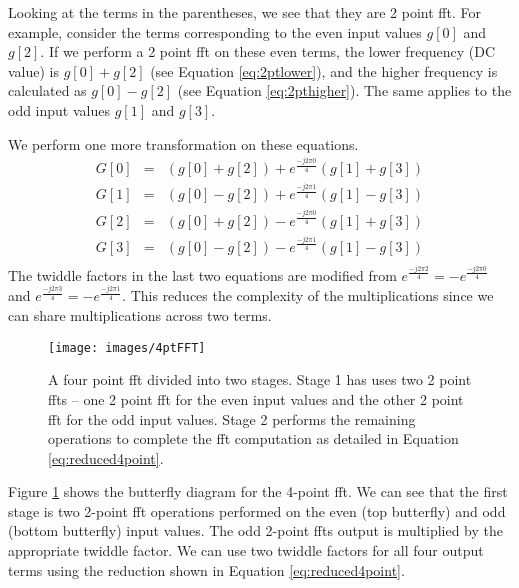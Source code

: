 Looking at the terms in the parentheses, we see that they are 2 point \gls{fft}. For example, consider the terms corresponding to the even input values $g[0]$ and $g[2]$. If we perform a 2 point \gls{fft} on these even terms, the lower frequency (DC value) is $g[0] + g[2]$ (see Equation \ref{eq:2ptlower}), and the higher frequency is calculated as $g[0] - g[2]$ (see Equation \ref{eq:2pthigher}). The same applies to the odd input values $g[1]$ and $g[3]$. 

We perform one more transformation on these equations.
\begin{equation}
\begin{array} {lll} 
G[0] & = & (g[0] + g[2]) + e^{\frac{-j 2 \pi 0}{4}} (g[1] + g[3])\\
G[1] & = & (g[0] - g[2]) + e^{\frac{-j 2 \pi 1}{4}} (g[1] - g[3])\\
G[2] & = & (g[0] + g[2]) - e^{\frac{-j 2 \pi 0}{4}} (g[1] + g[3])\\
G[3] & = & (g[0] - g[2]) - e^{\frac{-j 2 \pi 1}{4}} (g[1] - g[3])\\
\end{array}
\label{eq:reduced4point}
\end{equation}
The twiddle factors in the last two equations are modified from $e^{\frac{-j 2 \pi 2}{4}} = -e^{\frac{-j 2 \pi 0}{4}}$ and $e^{\frac{-j 2 \pi 3}{4}} = -e^{\frac{-j 2 \pi 1}{4}}$. This reduces the complexity of the multiplications since we can share multiplications across two terms. 

\begin{figure}
\centering
\texttt{[image: images/4ptFFT]}
\caption{A four point \gls{fft} divided into two stages. Stage 1 has uses two 2 point \gls{fft}s -- one 2 point \gls{fft} for the even input values and the other 2 point \gls{fft} for the odd input values. Stage 2 performs the remaining operations to complete the \gls{fft} computation as detailed in Equation \ref{eq:reduced4point}. }
\label{fig:4ptFFT}
\end{figure}

Figure \ref{fig:4ptFFT} shows the butterfly diagram for the 4-point \gls{fft}. We can see that the first stage is two 2-point \gls{fft} operations performed on the even (top butterfly) and odd (bottom butterfly) input values. The odd 2-point \gls{fft}s output is multiplied by the appropriate twiddle factor. We can use two twiddle factors for all four output terms using the reduction shown in Equation \ref{eq:reduced4point}.

